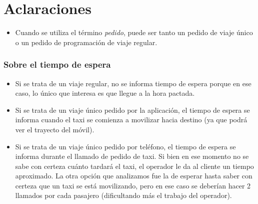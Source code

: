 \documentclass[a4paper]{article}
\begin{document}
\newtheorem{teo}{Teorema}[section]
\newtheorem{propo}{Proposici\'{o}n}[section]
\newtheorem{lema}{Lema}[section]
\newtheorem{coro}{Corolario}[section]
\newtheorem{defi}{Definici\'{o}n}[section]

\newpage
\thispagestyle{empty}
\tableofcontents

\parskip=5pt
\setlength{\parindent}{0pt}

\newpage
\setcounter{page}{1}
\pagestyle{plain}

\newpage


\newcommand{\Asig}{\ensuremath{\leftarrow}}
\newcommand{\AndY}{\ensuremath{\wedge}}
\newcommand{\Or}{\ensuremath{\vee}}
\newcommand{\Not}{\ensuremath{\neg}}
\newcommand{\NotEq}{\ensuremath{\neq}}
\newcommand{\MayorIg}{\ensuremath{\geq}}
\newcommand{\tabu}{\hspace*{0.7cm}}
\newcommand{\ctabu}{\hspace*{0.8cm}}
\newcommand{\htabu}{\hspace*{0.35cm}}
\newcommand{\moduloNombre}[1]{\textbf{#1}}

\section{Aclaraciones}
\begin{itemize}
\item Cuando se utiliza el t\'ermino \textit{pedido}, puede ser tanto un pedido de viaje \'unico o un pedido de programaci\'on
de viaje regular.
\end{itemize}

\subsubsection{Sobre el tiempo de espera}
\begin{itemize}
\item Si se trata de un viaje regular, no se informa tiempo de espera porque en ese caso, lo \'unico que interesa es que llegue
a la hora pactada.
\item Si se trata de un viaje \'unico pedido por la aplicaci\'on, el tiempo de espera se informa cuando el taxi se comienza a movilizar
hacia destino (ya que podr\'a ver el trayecto del m\'ovil).
\item Si se trata de un viaje \'unico pedido por tel\'efono, el tiempo de espera se informa durante el llamado de pedido de taxi.
Si bien en ese momento no se sabe con certeza cu\'anto tardar\'a el taxi, el operador le da al cliente un tiempo aproximado.
La otra opción que analizamos fue la de esperar hasta saber con certeza que un taxi se est\'a movilizando, pero en ese caso
se deber\'ian hacer 2 llamados por cada pasajero (dificultando m\'as el trabajo del operador).
\end{itemize}
\end{document}
